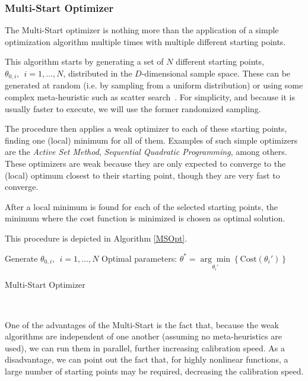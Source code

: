 \subsubsection{Multi-Start Optimizer}
The Multi-Start optimizer is nothing more than the application of a simple optimization algorithm multiple times with multiple different starting points.


This algorithm starts by generating a set of $N$ different starting points, $\theta_{0,i},\ \ i=1,\ldots,N$, distributed in the $D$-dimensional sample space. These can be generated at random (i.e. by sampling from a uniform distribution) or using some complex meta-heuristic such as scatter search~\cite{Ugray}. For simplicity, and because it is usually faster to execute, we will use the former randomized sampling.


The procedure then applies a weak optimizer to each of these starting points, finding one (local) minimum for all of them. Examples of such simple optimizers are the \emph{Active Set Method}, \emph{Sequential Quadratic Programming}, among others. These optimizers are weak because they are only expected to converge to the (local) optimum closest to their starting point, though they are very fast to converge.

After a local minimum is found for each of the selected starting points, the minimum where the cost function is minimized is chosen as optimal solution.

This procedure is depicted in Algorithm \ref{MSOpt}.

\begin{algorithm}[H]\label{MSOpt}
\DontPrintSemicolon
Generate $\theta_{0,i},\ \ i=1,\ldots,N$
 Optimal parameters: $\theta^{*}=\underset{\theta_i'}{\arg\min}\left\{\mathrm{Cost}(\theta_i')\right\}$\;
 \caption{Multi-Start Optimizer}
\end{algorithm}
\ 

One of the advantages of the Multi-Start is the fact that, because the weak algorithms are independent of one another (assuming no meta-heuristics are used), we can run them in parallel, further increasing calibration speed.
As a disadvantage, we can point out the fact that, for highly nonlinear functions, a large number of starting points may be required, decreasing the calibration speed.

